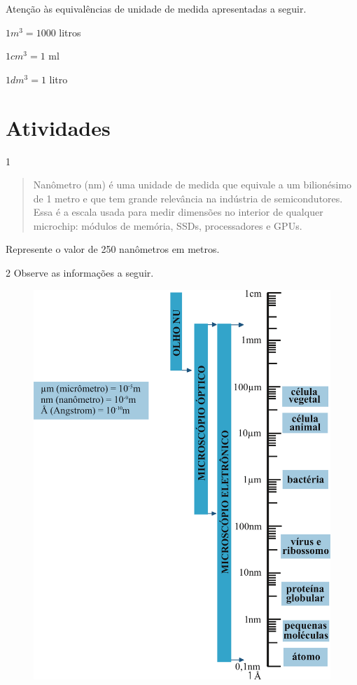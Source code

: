 {Atenção às equivalências de unidade de medida apresentadas a seguir.

$1 m^3 = 1000$ litros

$1 cm^3 = 1$ ml

$1 dm^3 = 1$ litro
}

\section*{Atividades}

\num{1} 

\begin{quote}
Nanômetro (nm) é uma unidade de medida que equivale a um bilionésimo
de 1 metro e que tem grande relevância na indústria de semicondutores.
Essa é a escala usada para medir dimensões no interior de qualquer
microchip: módulos de memória, SSDs, processadores e GPUs.

\end{quote}

\pagebreak
Represente o valor de 250 nanômetros em metros.

\begin{emptybox}
\end{emptybox}

\num{2} Observe as informações a seguir.

\begin{figure}[htpb!]
\centering
\includegraphics[width=.58\textwidth]{./ilustras-mat/modulo_14-atividade_2.png}
\end{figure}

